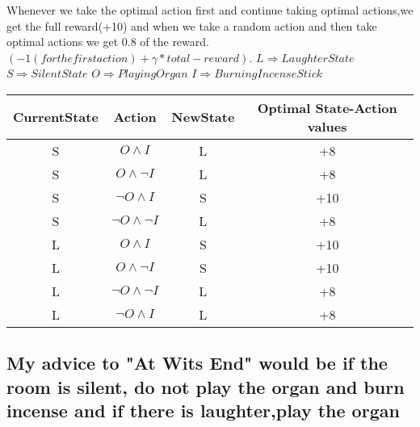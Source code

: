 \documentclass{article}
\begin{document}
Whenever we take the optimal action first and continue taking optimal actions,we get the full reward(+10) and when we take a random action and then take optimal actions we get 0.8 of the reward.$(-1(for the first action)+\gamma*total-reward).$\newline\newline
$L \Longrightarrow Laughter State$\newline
$S \Longrightarrow Silent State$\newline
$O \Longrightarrow Playing Organ$\newline
$I \Longrightarrow Burning Incense Stick$\newline

	\begin{table}[h!]
		\begin{tabular}{c|c|c|c}
			CurrentState & Action & NewState & Optimal State-Action values\\
			\hline\newline
			S & $O \land I$ & L & +8\\ 
			S & $O \land \neg I$ & L & +8\\
			S & $\neg O \land I $ & S & +10 \\
			S & $\neg O \land \neg I$ & L & +8 \\
			L & $O \land I$ & S & +10\\ 
			L & $O \land \neg I$ & S & +10\\
			L & $\neg O \land \neg I$ & L & +8\\
			L & $\neg O \land  I$ & L & +8\\
		\end{tabular}
	\end{table}


\subsection{My advice to "At Wits End" would be if the room is silent, do not play the organ and burn incense and if there is laughter,play the organ}
\end{document}
